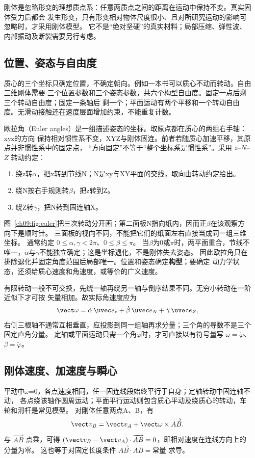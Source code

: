 刚体是忽略形变的理想质点系：任意两质点之间的距离在运动中保持不变。真实固体受力后都会
发生形变，只有形变相对物体尺度很小、且对所研究运动的影响可忽略时，才采用刚体模型。
它不是“绝对坚硬”的真实材料；局部压缩、弹性波、内部振动及断裂需要另行考虑。

\subsection{位置、姿态与自由度}
质心的三个坐标只确定位置，不确定朝向。例如一本书可以质心不动而转动。自由三维刚体需要
三个位置参数和三个姿态参数，共六个构型自由度。固定一点后剩三个转动自由度；固定一条轴后
剩一个；平面运动有两个平移和一个转动自由度。无滑动接触还在速度层面增加约束，不能重复计数。

欧拉角（Euler angles）是一组描述姿态的坐标。取原点都在质心的两组右手轴：xyz的方向
保持相对惯性系不变，XYZ与刚体固连。前者若随质心加速平移，其原点并非惯性系中的固定点，
“方向固定”不等于“整个坐标系是惯性系”。采用 $z$--$N$--$Z$ 转动约定：
\begin{enumerate}[label=(\arabic*),leftmargin=2.4em]
 \item 绕z转$\alpha$，把x转到节线N；N是xy与XY平面的交线，取向由转动约定给出。
 \item 绕N按右手规则转$\beta$，把z转到Z。
 \item 绕Z转$\gamma$，把N转到固连轴X。
\end{enumerate}
图~\ref{ch09:fig:euler}把三次转动分开画；第二面板N指向纸内，因而正$\beta$在该观察方向下是顺时针。
三面板的视向不同，不能把它们的纸面左右直接当成同一组三维坐标。
\eulerDiagram
通常约定 $0\le\alpha,\gamma<2\pi$、$0\le\beta\le\pi$。
当$\beta$为0或$\pi$时，两平面重合，节线不唯一，$\alpha$与$\gamma$不能独立确定；这是坐标退化，不是刚体失去姿态。
因此欧拉角只在排除退化并固定角度范围后局部唯一。位置和姿态确定\textbf{构型}；要确定
动力学状态，还须给质心速度和角速度，或等价的广义速度。

有限转动一般不可交换，先绕一轴再绕另一轴与倒序结果不同。无穷小转动在一阶近似下才可按
矢量相加。故实际角速度应为
\begin{equation}
 \vect\omega=\dot\alpha\,\uvec e_z+\dot\beta\,\uvec e_N+\dot\gamma\,\uvec e_Z,
\end{equation}
右侧三根轴不通常互相垂直，应投影到同一组轴再求分量；三个角的导数不是三个固定直角分量。
定轴或平面运动只需一个角$\varphi$时，才可直接以有符号量写 $\omega=\dot\varphi$、$\beta=\ddot\varphi$。

\subsection{刚体速度、加速度与瞬心}
平动中$\omega$=0，各点速度相同，任一固连线段始终平行于自身；定轴转动中固连轴不动，
各点绕该轴作圆周运动；平面平行运动则包含质心平动及绕质心的转动，车轮和滑杆是常见模型。
对刚体任意两点A、B，有
\begin{equation}
 \vect v_B=\vect v_A+\vect\omega\times\overrightarrow{AB}.\label{ch09:eq:rigid-velocity}
\end{equation}
与 $\overrightarrow{AB}$ 点乘，可得
$(\vect v_B-\vect v_A)\cdot\overrightarrow{AB}=0$，即相对速度在连线方向上的分量为零。
这也等于对固定长度条件 $\overrightarrow{AB}\cdot\overrightarrow{AB}=\text{常量}$ 求导。

